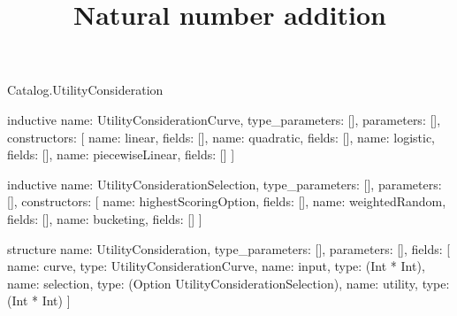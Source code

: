 \begin{lexlean}{Catalog.UtilityConsideration}
\title{Natural number addition}
\begin{semanticmodule}
inductive{
  name: UtilityConsiderationCurve,
  type_parameters: [],
  parameters: [],
  constructors: [
    {name: linear, fields: []},
    {name: quadratic, fields: []},
    {name: logistic, fields: []},
    {name: piecewiseLinear, fields: []}
  ]
}

inductive{
  name: UtilityConsiderationSelection,
  type_parameters: [],
  parameters: [],
  constructors: [
    {name: highestScoringOption, fields: []},
    {name: weightedRandom, fields: []},
    {name: bucketing, fields: []}
  ]
}

structure{
  name: UtilityConsideration,
  type_parameters: [],
  parameters: [],
  fields: [
    {name: curve, type: UtilityConsiderationCurve},
    {name: input, type: (Int * Int)},
    {name: selection, type: (Option UtilityConsiderationSelection)},
    {name: utility, type: (Int * Int)}
  ]
}
\end{semanticmodule}
\end{lexlean}
